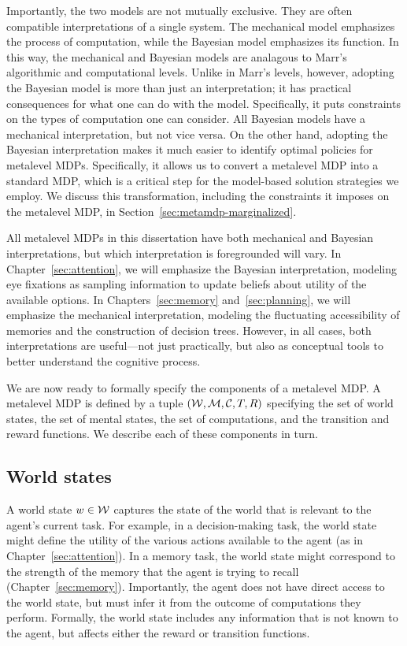 Importantly, the two models are not mutually exclusive. They are often compatible interpretations of a single system. The mechanical model emphasizes the process of computation, while the Bayesian model emphasizes its function. In this way, the mechanical and Bayesian models are analagous to Marr's algorithmic and computational levels. Unlike in Marr's levels, however, adopting the Bayesian model is more than just an interpretation; it has practical consequences for what one can do with the model. Specifically, it puts constraints on the types of computation one can consider. All Bayesian models have a mechanical interpretation, but not vice versa. On the other hand, adopting the Bayesian interpretation makes it much easier to identify optimal policies for metalevel MDPs. Specifically, it allows us to convert a metalevel MDP into a standard MDP, which is a critical step for the model-based solution strategies we employ. We discuss this transformation, including the constraints it imposes on the metalevel MDP, in Section~\ref{sec:metamdp-marginalized}.

All metalevel MDPs in this dissertation have both mechanical and Bayesian interpretations, but which interpretation is foregrounded will vary. In Chapter~\ref{sec:attention}, we will emphasize the Bayesian interpretation, modeling eye fixations as sampling information to update beliefs about utility of the available options. In Chapters~\ref{sec:memory} and~\ref{sec:planning}, we will emphasize the mechanical interpretation, modeling the fluctuating accessibility of memories and the construction of decision trees. However, in all cases, both interpretations are useful---not just practically, but also as conceptual tools to better understand the cognitive process.

\separator

We are now ready to formally specify the components of a metalevel MDP. A metalevel MDP is defined by a tuple $(\mathcal{W}, \mathcal{M}, \mathcal{C}, T, R)$ specifying the set of world states, the set of mental states, the set of computations, and the transition and reward functions. We describe each of these components in turn.


\subsection{World states}
A world state $w \in \mathcal{W}$ captures the state of the world that is relevant to the agent's current task. For example, in a decision-making task, the world state might define the utility of the various actions available to the agent (as in Chapter~\ref{sec:attention}). In a memory task, the world state might correspond to the strength of the memory that the agent is trying to recall (Chapter~\ref{sec:memory}). Importantly, the agent does not have direct access to the world state, but must infer it from the outcome of computations they perform. Formally, the world state includes any information that is not known to the agent, but affects either the reward or transition functions.

